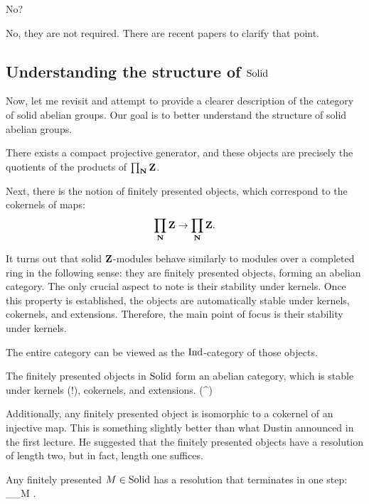 \ques No? 

\ans No, they are not required. There are recent papers to clarify that point.

\subsection{Understanding the structure of $\mathrm{Solid}$}

Now, let me revisit and attempt to provide a clearer description of the category of solid abelian groups. Our goal is to better understand the structure of solid abelian groups.

\bit
	\item There exists a compact projective generator, and these objects are precisely the quotients of the products of $\prod_\mathbf N \mathbf Z$.
	\item Next, there is the notion of finitely presented objects, which correspond to the cokernels of maps: 
	\begin{align*} 
	\prod_\mathbf N \mathbf Z \to \prod_\mathbf N \mathbf Z.
	\end{align*}
\eit

It turns out that solid $\mathbf Z$-modules behave similarly to modules over a completed ring in the following sense: they are finitely presented objects, forming an abelian category. The only crucial aspect to note is their stability under kernels.
Once this property is established, the objects are automatically stable under kernels, cokernels, and extensions. Therefore, the main point of focus is their stability under kernels.

The entire category can be viewed as the $\mathrm{Ind}$-category of those objects. 

\begin{theorem}
The finitely presented objects in $\mathrm{Solid}$ form an abelian category, which is stable under kernels (!), cokernels, and extensions.
\be
\Solid \iso \Ind(\Solid^{})
\ee

\end{theorem}

Additionally, any finitely presented object is isomorphic to a cokernel of an injective map. This is something slightly better than what Dustin announced in the first lecture. 
He suggested that the finitely presented objects have a resolution of length two, but in fact, length one suffices.

\bl \label{lemma:06-fin-pres}
Any finitely presented $M \in \mathrm{Solid}$ has a resolution that terminates in one step:
 \to \prod_\N \Z \to \prod_\N \Z \to M .
\ee
\el

